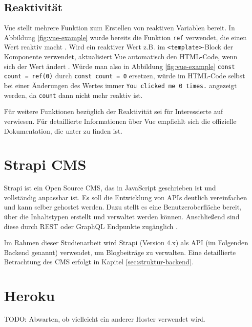 %
%
\subsection{Reaktivität}
Vue stellt mehrere Funktion zum Erstellen von reaktiven Variablen bereit. In Abbildung \ref{fig:vue-example} wurde bereits die Funktion \lstinline{ref} verwendet, die einen Wert reaktiv macht \cite[vgl.][]{VueApiReactiveCore}. Wird ein reaktiver Wert z.B. im \lstinline{<template>}-Block der Komponente verwendet, aktualisiert Vue automatisch den HTML-Code, wenn sich der Wert ändert \cite[vgl.][]{VueReactiveFundamentals}. Würde man also in Abbildung \ref{fig:vue-example} \glqq \lstinline{const count = ref(0)}\grqq{} durch \glqq \lstinline{const count = 0}\grqq{} ersetzen, würde im HTML-Code selbst bei einer Änderungen des Wertes immer \glqq \lstinline{You clicked me 0 times.}\grqq{} angezeigt werden, da \lstinline{count} dann nicht mehr reaktiv ist.

Für weitere Funktionen bezüglich der Reaktivität sei für Interessierte auf \cite{VueApiReactiveCore} verwiesen. Für detaillierte Informationen über Vue empfiehlt sich die offizielle Dokumentation, die unter \cite{VueIntroduction} zu finden ist.

%
%
\section{Strapi CMS}
Strapi ist ein Open Source CMS, das in JavaScript geschrieben ist und vollständig anpassbar ist. Es soll die Entwicklung von APIs deutlich vereinfachen und kann selber gehostet werden. Dazu stellt es eine Benutzeroberfläche bereit, über die Inhaltstypen erstellt und verwaltet werden können. Anschließend sind diese durch REST oder GraphQL Endpunkte zugänglich \cite[vgl.][]{Strapi}.

Im Rahmen dieser Studienarbeit wird Strapi (Version 4.x) als API (im Folgenden \glqq Backend\grqq{} genannt) verwendet, um Blogbeiträge zu verwalten. Eine detaillierte Betrachtung des CMS erfolgt in Kapitel \ref{sec:struktur-backend}.

%
%
\section{Heroku}
TODO: Abwarten, ob vielleicht ein anderer Hoster verwendet wird.
